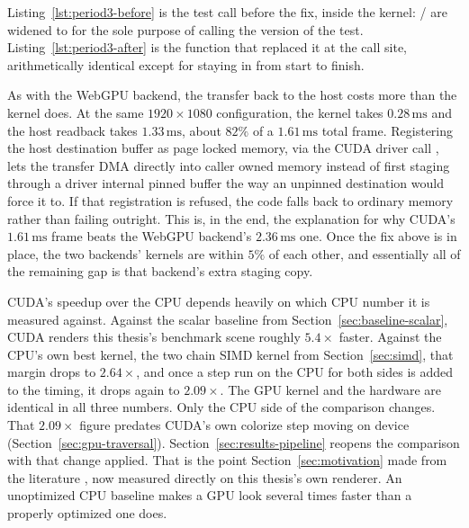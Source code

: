 \documentclass{ftndiplomski}
\begin{document}
Listing~\ref{lst:period3-before} is the test call before the fix, inside the 
kernel: / are widened to  for the sole purpose of calling the
 version of the test. Listing~\ref{lst:period3-after} is the function that replaced it at
the call site, arithmetically identical except for staying in  from start to finish.

\noindent\begin{minipage}{\linewidth}

\end{minipage}

\noindent\begin{minipage}{\linewidth}

\end{minipage}

As with the WebGPU backend, the transfer back to the host costs more than the kernel does. At the
same $1920\times1080$ configuration, the kernel takes $0.28\,\mathrm{ms}$ and the host readback
takes $1.33\,\mathrm{ms}$, about $82\%$ of a $1.61\,\mathrm{ms}$ total frame.
Registering the host destination buffer as page locked memory, via the CUDA driver call ,
lets the transfer DMA directly into caller owned memory instead of first staging through a
driver internal pinned buffer the way an unpinned destination would force it to. If that
registration is refused, the code falls back to ordinary memory rather than failing outright. This
is, in the end, the explanation for why CUDA's $1.61\,\mathrm{ms}$ frame beats the WebGPU backend's
$2.36\,\mathrm{ms}$ one. Once the fix above is in place, the two backends' kernels are within $5\%$
of each other, and essentially all of the remaining gap is that backend's extra staging copy.

CUDA's speedup over the CPU depends heavily on which CPU number it is measured against. Against
the scalar  baseline from Section~\ref{sec:baseline-scalar}, CUDA renders this thesis's
benchmark scene roughly $5.4\times$ faster. Against the CPU's own best kernel, the two chain 
SIMD kernel from Section~\ref{sec:simd}, that margin drops to $2.64\times$, and once a
 step run on the CPU for both sides is added to the timing, it drops again to
$2.09\times$. The GPU kernel and the hardware are identical in all three numbers. Only the CPU side
of the comparison changes. That $2.09\times$ figure predates CUDA's own colorize step moving
on device (Section~\ref{sec:gpu-traversal}). Section~\ref{sec:results-pipeline} reopens the
comparison with that change applied. That is the point Section~\ref{sec:motivation} made from the literature
\cite{lee2010debunking}, now measured directly on this thesis's own renderer. An unoptimized CPU
baseline makes a GPU look several times faster than a properly optimized one does.
\end{document}
